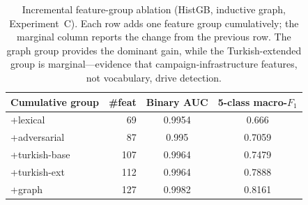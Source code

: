 \begin{table}[htbp]
\centering
\caption{Incremental feature-group ablation (HistGB, inductive graph, Experiment~C). Each row adds one feature group cumulatively; the marginal column reports the change from the previous row. The graph group provides the dominant gain, while the Turkish-extended group is marginal---evidence that campaign-infrastructure features, not vocabulary, drive detection.}
\label{tab:group-ablation}
\footnotesize
\begin{tabular}{lrcc}
\toprule
Cumulative group & \#feat & Binary AUC & 5-class macro-$F_1$ \\
\midrule
+lexical & 69 & 0.9954 & 0.666 \\
+adversarial & 87 & 0.995 & 0.7059 \\
+turkish-base & 107 & 0.9964 & 0.7479 \\
+turkish-ext & 112 & 0.9964 & 0.7888 \\
+graph & 127 & 0.9982 & 0.8161 \\
\bottomrule
\end{tabular}
\end{table}